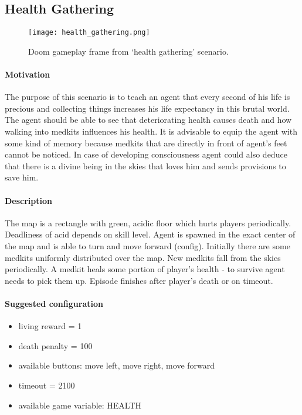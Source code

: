 	\subsection{Health Gathering}
		\begin{figure}
			\centering
			\texttt{[image: health\_gathering.png]}
			\caption{Doom gameplay frame from `health gathering' scenario.}\label{fig:health_gathering}
		\end{figure}
		\paragraph{Motivation}
			The purpose of this scenario is to teach an agent that every second of his life is precious and collecting things increases his life expectancy in this brutal world. The agent should be able to see that deteriorating health causes death and how walking into medkits influences his health. It is advisable to equip the agent with some kind of memory because medkits that are directly in front of agent's feet cannot be noticed. In case of developing consciousness agent could also deduce that there is a divine being in the skies that loves him and sends provisions to save him.

		\paragraph{Description}
			The map is a rectangle with green, acidic floor which hurts players periodically. Deadliness of acid depends on skill level. Agent is spawned in the exact center of the map and is able to turn and move forward (config).  Initially there are some medkits uniformly distributed over the map. New medkits fall from the skies periodically. A medkit heals some portion of player's health - to survive agent needs to pick them up. Episode finishes after player's death or on timeout.

		\paragraph{Suggested configuration}
		\begin{itemize}
			\item living reward = 1
			\item death penalty = 100
			\item available buttons: move left, move right, move forward
			\item timeout = 2100
			\item available game variable: HEALTH
		\end{itemize}
	\newpage

